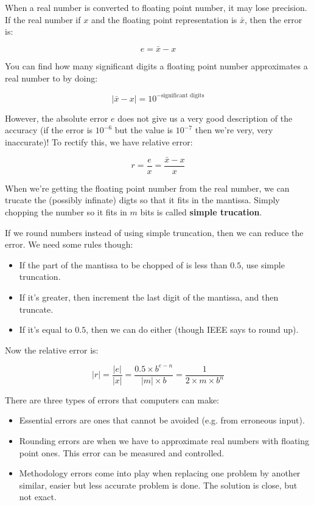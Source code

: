 
When a real number is converted to floating point number, it may lose precision.
If the real number if $x$ and the floating point representation is
$\bar{x}$, then the error is:

\[
  e = \bar{x} - x
\]

You can find how many significant digits a floating point number approximates a
real number to by doing:

\[
  |\bar{x} - x| = 10^{-\text{significant digits}}
\]


However, the absolute error $e$ does not give us a very good description of the
accuracy (if the error is $10^{-6}$ but the value is $10^{-7}$ then we're very,
very inaccurate)! To rectify this, we have relative error:

\[
  r = \frac{e}{x} = \frac{\bar{x} - x}{x}
\]


When we're getting the floating point number from the real number, we can
trucate the (possibly infinate) digts so that it fits in the mantissa. Simply
chopping the number so it fits in $m$ bits is called \textbf{simple trucation}.

If we round numbers instead of using simple truncation, then we can reduce the
error. We need some rules though:

\begin{itemize}
  \item If the part of the mantissa to be chopped of is less than $0.5$, use
  simple truncation.
  \item If it's greater, then increment the last digit of the mantissa, and then
  truncate.
  \item If it's equal to $0.5$, then we can do either (though IEEE says to round
  up).
\end{itemize}

Now the relative error is:

\[
  |r| = \frac{|e|}{|x|} = \frac{0.5 \times b^{e-n}}{|m|\times b}
      = \frac{1}{2 \times m \times b^n}
\]

There are three types of errors that computers can make:

\begin{itemize}
  \item Essential errors are ones that cannot be avoided (e.g. from erroneous
  input).
  \item Rounding errors are when we have to approximate real numbers with
  floating point ones. This error can be measured and controlled.
  \item Methodology errors come into play when replacing one problem by another
  similar, easier but less accurate problem is done. The solution is close, but
  not exact.
\end{itemize}

